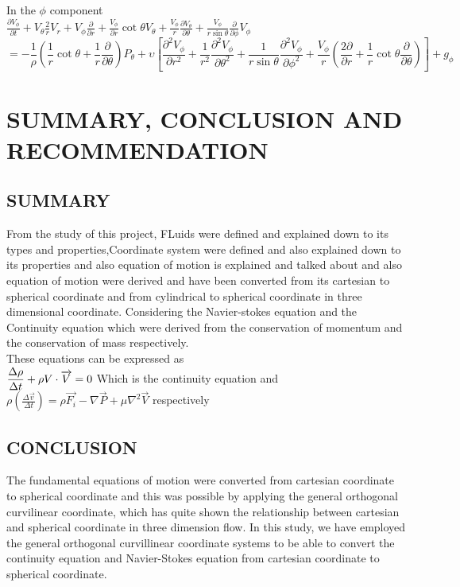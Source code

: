 \documentclass[a4paper, 12pt]{report}
\newcommand{\sps}{\\[0.2cm]}
\newcommand{\NI}{\noindent}
\newcommand{\dsp}{\displaystyle}
\begin{document}
\NI In the $\phi$ component
\sps
$\dsp
\frac{\partial V_\phi}{\partial t} + V_\theta \frac{2}{r}V_r + V_\phi \frac{\partial}{\partial r} + \frac{V_\phi}{\partial r}\cot\theta V_\theta + \frac{V_\phi}{r}\frac{\partial V_\theta}{\partial\theta} + \frac{V_\phi}{r\sin\theta}\frac{\partial}{\partial\phi}V_\phi
$
\begin{equation}
	= - \frac{1}{\rho}\left(\frac{1}{r}\cot\theta + \frac{1}{r}\frac{\partial}{\partial \theta}\right)P_\theta + \upsilon \left[\frac{\partial^2V_\phi}{\partial r^2} + \frac{1}{r^2}\frac{\partial^2V_\phi}{\partial\theta^2} + \frac{1}{r\sin\theta}\frac{\partial^2V_\phi}{\partial\phi^2} + \frac{V_\phi}{r}\left(\frac{2\partial}{\partial r} + \frac{1}{r}\cot\theta\frac{\partial}{\partial\theta}\right)\right] + g_\phi
\end{equation}



\chapter{SUMMARY, CONCLUSION AND RECOMMENDATION}

\section{SUMMARY}
From the study of this project, FLuids were defined and explained down to its types and properties,Coordinate system were defined and also explained down to its properties and also equation of motion is explained and talked about and also  equation of motion were derived and have been converted from its cartesian to spherical coordinate and from cylindrical  to spherical coordinate in three dimensional coordinate. Considering the Navier-stokes equation and the Continuity equation which were derived from the conservation of momentum and the conservation of mass respectively.\sps

\NI These equations can be expressed as\sps
$\dsp
\frac{\Delta \rho}{\Delta t} + \rho V \cdot \overrightarrow{V} = 0 \sps
$
Which is the continuity equation and\sps
$\dsp
\rho\left(\frac{\Delta\overrightarrow{v}}{\Delta t}\right) = \rho \overrightarrow{F_i} - \nabla \overrightarrow{P} + \mu \nabla^2\overrightarrow{V}
$
respectively


\section{CONCLUSION}
The fundamental equations of motion were converted from cartesian coordinate to spherical coordinate and this was possible by applying the general orthogonal curvilinear coordinate, which has quite shown the relationship between cartesian and spherical coordinate in three dimension flow.\newline
In this study, we have employed the general orthogonal curvillinear coordinate systems to be able to convert the continuity equation and Navier-Stokes equation from cartesian coordinate to spherical coordinate.
\end{document}
